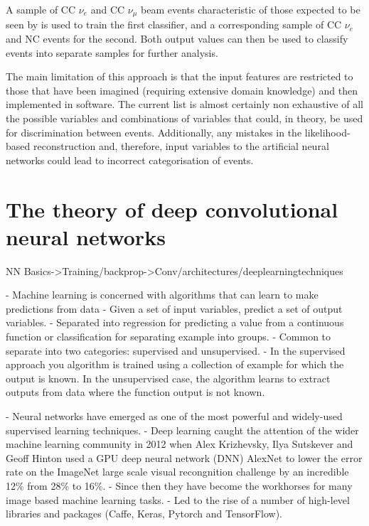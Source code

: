 A sample of CC $\nu_{e}$ and CC $\nu_{\mu}$ beam events characteristic of those expected to be
seen by \chips is used to train the first classifier, and a corresponding sample of CC $\nu_{e}$
and NC events for the second. Both output values can then be used to classify events into separate
samples for further analysis.

The main limitation of this approach is that the input features are restricted to those that have
been imagined (requiring extensive domain knowledge) and then implemented in software. The current
list is almost certainly non exhaustive of all the possible variables and combinations of
variables that could, in theory, be used for discrimination between events. Additionally, any
mistakes in the likelihood-based reconstruction and, therefore, input variables to the artificial
neural networks could lead to incorrect categorisation of events.

\section{The theory of deep convolutional neural networks} %
\label{sec:cvn_theory} %

NN Basics->Training/backprop->Conv/architectures/deeplearningtechniques

- Machine learning is concerned with algorithms that can learn to make predictions from data
- Given a set of input variables, predict a set of output variables.
- Separated into regression for predicting a value from a continuous function or classification
for separating example into groups.
- Common to separate into two categories: supervised and unsupervised.
- In the supervised approach you algorithm is trained using a collection of example for which the
output is known. In the unsupervised case, the algorithm learns to extract outputs from data where
the function output is not known.

- Neural networks have emerged as one of the most powerful and widely-used supervised learning
techniques.
- Deep learning caught the attention of the wider machine learning community in 2012 when Alex
Krizhevsky, Ilya Sutskever and Geoff Hinton used a GPU deep neural network (DNN) AlexNet to lower
the error rate on the ImageNet large scale visual recongnition challenge by an incredible 12\%
from 28\% to 16\%.
- Since then they have become the workhorses for many image based machine learning tasks.
- Led to the rise of a number of high-level libraries and packages (Caffe, Keras, Pytorch and
TensorFlow).

